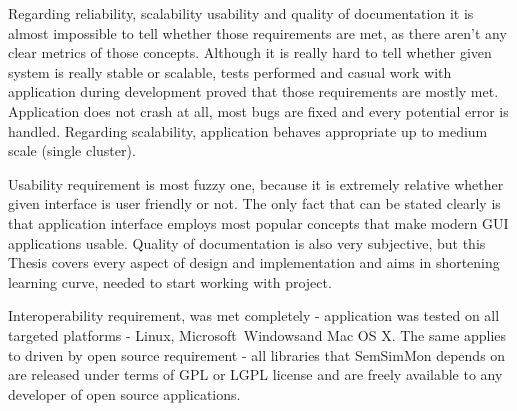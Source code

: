 Regarding reliability, scalability usability and quality of documentation it is almost impossible to tell whether those requirements are met, as there aren\rq{}t any clear metrics of those concepts. Although it is really hard to tell whether given system is really stable or scalable, tests performed and casual work with application during development proved that those requirements are mostly met. Application does not crash at all, most bugs are fixed and every potential error is handled. Regarding scalability, application behaves appropriate up to medium scale (single cluster). 

Usability requirement is most fuzzy one, because it is extremely relative whether given interface is user friendly or not. The only fact that can be stated clearly is that application interface employs most popular concepts that make modern GUI applications usable. Quality of documentation is also very subjective, but this Thesis covers every aspect of design and implementation and aims in shortening learning curve, needed to start working with project.

Interoperability requirement, was met completely - application was tested on all targeted platforms - Linux, Microsoft\textregistered~Windows\textregistered and Mac OS X\textregistered. The same applies to driven by open source requirement - all libraries that SemSimMon depends on are released under terms of GPL or LGPL license and are freely available to any developer of open source applications.

